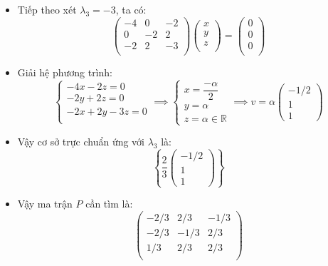 \documentclass[a4paper, 12pt]{report}
\begin{document}
\begin{itemize}
    \item Tiếp theo xét $\lambda_3 = -3$, ta có:
    $$
    \begin{pmatrix}
        -4 & 0 & -2 \\ 
        0 & -2 & 2 \\
        -2 & 2 & -3 \\
    \end{pmatrix} 
    \begin{pmatrix}
        x \\
        y \\
        z \\
    \end{pmatrix} 
    = 
    \begin{pmatrix}
        0 \\
        0 \\
        0 \\
    \end{pmatrix}
    $$

    \item Giải hệ phương trình:
    $$
    \begin{cases}
        -4x -2z = 0 \\
        -2y + 2z = 0 \\
        -2x + 2y -3z = 0 \\
    \end{cases}
    \implies
    \begin{cases}
        x = \dfrac{-\alpha}{2}\\
        y = \alpha \\
        z = \alpha \in \mathbb{R}
    \end{cases}
    \implies
    v = \alpha \begin{pmatrix}
        -1 / 2 \\ 
        1 \\
        1
    \end{pmatrix}
    $$

    \item Vậy cơ sở trực chuẩn ứng với $\lambda_3$ là:
    $$
    \left\{
        \dfrac{2}{3}
        \begin{pmatrix}
            -1 / 2\\
            1 \\
            1
        \end{pmatrix}
    \right\}
    $$

    \item Vậy ma trận $P$ cần tìm là:
    $$
    \begin{pmatrix}
        -2/3 & 2/3 & -1/3\\
        -2/3 & -1/3 & 2/3\\
        1/3 & 2/3 & 2/3 \\
    \end{pmatrix}
    $$


\end{itemize}
\end{document}
